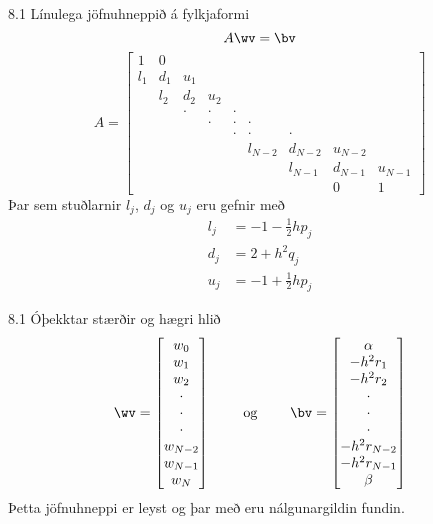 \begin{frame}{8.1 Línulega jöfnuhneppið á fylkjaformi} 
$$
  A\wv=\bv
$$
$$
  A=\left[\begin{matrix}
  1&0\\
  l_1&d_1&u_1\\
  &l_2&d_2&u_2\\
  &&\cdot&\cdot&\cdot \\
  &&&\cdot&\cdot&\cdot \\
  &&&&\cdot&\cdot&\cdot \\
  &&&&&l_{N-2}&d_{N-2}&u_{N-2} \\
  &&&&&&l_{N-1}&d_{N-1}&u_{N-1} \\
  &&&&&&&0&1
  \end{matrix}\right]
$$
Þar sem stuðlarnir $l_j$, $d_j$ og $u_j$ eru gefnir með 
\begin{align*}
  l_j&=-1-\tfrac 12 hp_j\\
d_j&=2+h^2q_j\\
u_j&=-1+\tfrac 12 hp_j
\end{align*}
\end{frame}


\begin{frame}{8.1 Óþekktar stærðir og hægri hlið} 
$$
  \wv=\left[
  \begin{matrix}
w_0\\ w_1\\ w_2\\ \cdot\\ \cdot\\ \cdot\\ 
w_{N-2}\\ w_{N-1}\\ w_N  
\end{matrix}\right]
\qquad \text{ og } \qquad 
\bv=\left[
\begin{matrix}
\alpha \\ -h^2r_1\\ -h^2r_2\\ \cdot \\ \cdot\\ \cdot\\
-h^2r_{N-2}\\ -h^2r_{N-1}\\ \beta
\end{matrix}\right]
$$
Þetta jöfnuhneppi er leyst og þar með eru nálgunargildin fundin.
\end{frame}


